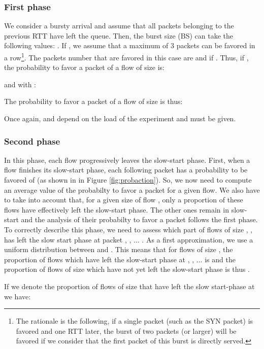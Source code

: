 \documentclass{elsart}
\begin{document}
\subsubsection*{First phase}

We consider a bursty arrival and assume that all packets belonging to the previous RTT have left the queue. Then, the burst size (BS) can take the following values: . If , we assume that a maximum of 3 packets can be favored in a row\footnote{The rationale is the following, if  a single packet (such as the SYN packet) is favored and one RTT later, the burst of two packets (or larger) will be favored if we consider that the first packet of this burst is directly served.}. The packets number that are favored in this case are  and   if . Thus, if , the probability to favor a packet of a flow of size  is:



and with :



The probability to favor a packet of a flow of size  is thus: 
\small

\normalsize

Once again,  and  depend on the load of the experiment and must be given.

\subsubsection*{Second phase}

In this phase, each flow progressively leaves the slow-start phase. First, when a flow finishes its slow-start phase, each following packet has a probability to be favored of  (as shown in in Figure \ref{fig:probaction}). So, we now need to compute an average value of the probabilty to favor a packet for a given flow. We also have to take into account that, for a given size of flow , only a proportion of these flows have effectively left the slow-start phase. The other ones remain in slow-start and the analysis of their probabilty to favor a packet follows the first phase.
To correctly describe this phase, we need to assess which part of flows of size , , has left the slow start phase at packet , , ... . As a first approximation, we use a uniform distribution between  and . This means that for flows of size , the proportion of flows which have left the slow-start phase at , , ...  is  and the proportion of flows of size  which have not yet left the slow-start phase is thus .

If we denote  the proportion of flows of size  that have left the slow start-phase at  we have: 
\end{document}

